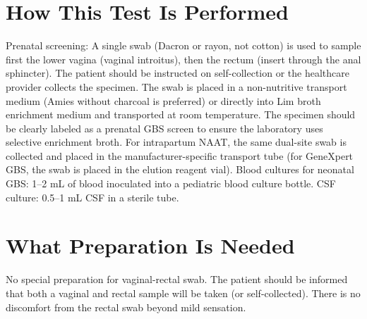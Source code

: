 \section*{How This Test Is Performed}
Prenatal screening: A single swab (Dacron or rayon, not cotton) is used to sample first the lower vagina (vaginal introitus), then the rectum (insert through the anal sphincter). The patient should be instructed on self-collection or the healthcare provider collects the specimen. The swab is placed in a non-nutritive transport medium (Amies without charcoal is preferred) or directly into Lim broth enrichment medium and transported at room temperature. The specimen should be clearly labeled as a prenatal GBS screen to ensure the laboratory uses selective enrichment broth. For intrapartum NAAT, the same dual-site swab is collected and placed in the manufacturer-specific transport tube (for GeneXpert GBS, the swab is placed in the elution reagent vial). Blood cultures for neonatal GBS: 1--2 mL of blood inoculated into a pediatric blood culture bottle. CSF culture: 0.5--1 mL CSF in a sterile tube.

\section*{What Preparation Is Needed}
No special preparation for vaginal-rectal swab. The patient should be informed that both a vaginal and rectal sample will be taken (or self-collected). There is no discomfort from the rectal swab beyond mild sensation.

